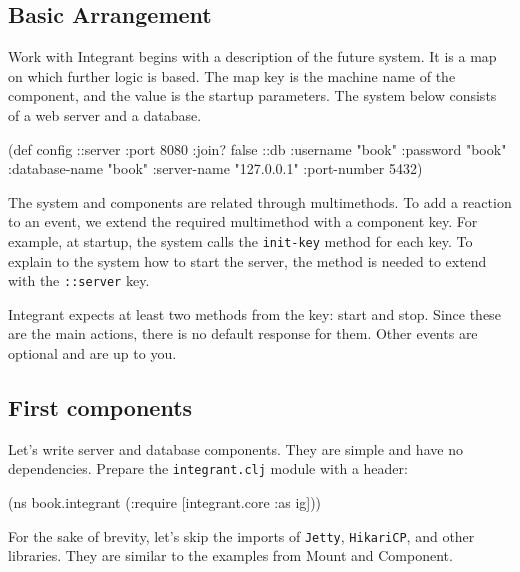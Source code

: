 \subsection{Basic Arrangement}

Work with Integrant begins with a description of the future system. It is a map on which further logic is based. The map key is the machine name of the component, and the value is the startup parameters. The system below consists of a web server and a database.

\begin{english}
  \begin{clojure}
(def config
  {::server {:port 8080 :join? false}
   ::db {:username      "book"
         :password      "book"
         :database-name "book"
         :server-name   "127.0.0.1"
         :port-number   5432}})
  \end{clojure}
\end{english}


The system and components are related through multimethods. To add a reaction to an event, we extend the required multimethod with a component key. For example, at startup, the system calls the \verb|init-key| method for each key. To explain to the system how to start the server, the method is needed to extend with the \verb|::server| key.

Integrant expects at least two methods from the key: start and stop. Since these are the main actions, there is no default response for them. Other events are optional and are up to you.

\subsection{First components}


Let's write server and database components. They are simple and have no dependencies. Prepare the \verb|integrant.clj| module with a header:

\begin{english}
  \begin{clojure}
(ns book.integrant
  (:require [integrant.core :as ig]))
  \end{clojure}
\end{english}

For the sake of brevity, let's skip the imports of \verb|Jetty|, \verb|HikariCP|, and other libraries. They are similar to the examples from Mount and Component.

